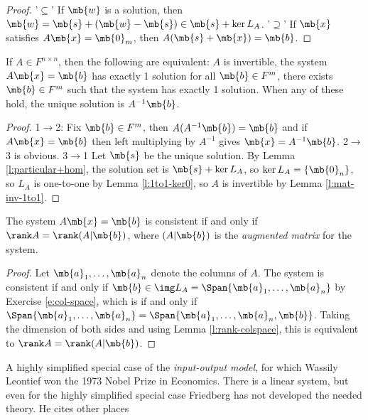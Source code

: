 \begin{proof}%
'$\subseteq$' If $\mb{w}$ is a solution, then $\mb{w}= \mb{s}+(\mb{w}- \mb{s}) \in \mb{s}+ \ker L_A$. '$\supseteq$' If $\mb{x}$ satisfies $A \mb{x}=\mb{0}_m$, then $A(\mb{s}+\mb{x})= \mb{b}$.
\end{proof}
\begin{lem}\label{l:inv-sys}
If $A \in F^{n \times n}$, then the following are equivalent: $A$ is invertible, the system $A \mb{x}=\mb{b}$ has exactly 1 solution for all $\mb{b}\in F^m$, there exists $\mb{b}\in F^m$ such that the system has exactly 1 solution. When any of these hold, the unique solution is $A^{-1}\mb{b}$.
\end{lem}
\begin{proof}%
1$\to$2: Fix $\mb{b}\in F^m$, then $A(A^{-1}\mb{b})=\mb{b}$ and if $A \mb{x}=\mb{b}$ then left multiplying by $A^{-1}$ gives $\mb{x}=A^{-1}\mb{b}$. 2$\to$3 is obvious. 3$\to$1 Let $\mb{s}$ be the unique solution. By Lemma \ref{l:particular+hom}, the solution set is $\mb{s}+\ker L_A$, so $\ker L_A= \{ \mb{0}_n \}$, so $L_A$ is one-to-one by Lemma \ref{l:1to1-ker0}, so $A$ is invertible by Lemma \ref{l:mat-inv-1to1}.
\end{proof}
\begin{lem}\label{l:system-augment}
The system $A \mb{x}=\mb{b}$ is consistent if and only if $\rank A= \rank(A|\mb{b})$, where $(A|\mb{b})$ is the \emph{augmented matrix} for the system.
\end{lem}
\begin{proof}
Let $\mb{a}_1, \ldots,\mb{a}_n$ denote the columns of $A$. The system is consistent if and only if $\mb{b}\in \img L_A= \Span \{ \mb{a}_1, \ldots,\mb{a}_n \}$ by Exercise \ref{e:col-space}, which is if and only if $\Span \{ \mb{a}_1, \ldots,\mb{a}_n \}= \Span \{ \mb{a}_1, \ldots,\mb{a}_n, \mb{b}\}$. Taking the dimension of both sides and using Lemma \ref{l:rank-colspace}, this is equivalent to $\rank A= \rank(A|\mb{b})$.
\end{proof}
\begin{example}
{\color{red} A highly simplified special case of the \emph{input-output model}, for which Wassily Leontief won the 1973 Nobel Prize in Economics. There is a linear system, but even for the highly simplified special case Friedberg has not developed the needed theory. He cites other places}
\end{example}

